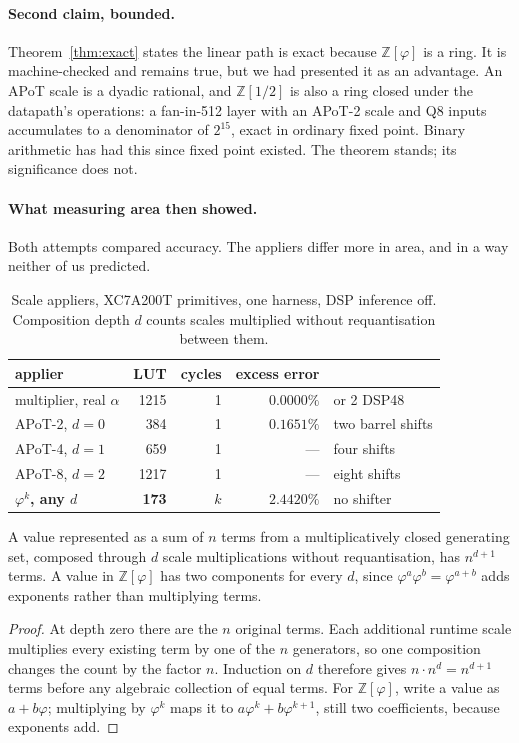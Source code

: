 \paragraph{Second claim, bounded.} Theorem~\ref{thm:exact} states the linear path
is exact because $\mathbb{Z}[\varphi]$ is a ring. It is machine-checked and
remains true, but we had presented it as an advantage. An APoT scale is a dyadic
rational, and $\mathbb{Z}[1/2]$ is also a ring closed under the datapath's
operations: a fan-in-512 layer with an APoT-2 scale and Q8 inputs accumulates to a
denominator of $2^{15}$, exact in ordinary fixed point. Binary arithmetic has had
this since fixed point existed. The theorem stands; its significance does not.

\paragraph{What measuring area then showed.} Both attempts compared accuracy. The
appliers differ more in area, and in a way neither of us predicted.

\begin{table}[t]\centering
\caption{Scale appliers, XC7A200T primitives, one harness, DSP inference off.
Composition depth $d$ counts scales multiplied without requantisation between
them.}
\label{tab:scalefrontier}
\begin{tabular}{lrrrl}
\toprule
applier & LUT & cycles & excess error & \\
\midrule
multiplier, real $\alpha$ & 1215 & 1 & $0.0000\%$ & or 2 DSP48 \\
APoT-2, $d=0$ & 384 & 1 & $0.1651\%$ & two barrel shifts \\
APoT-4, $d=1$ & 659 & 1 & --- & four shifts \\
APoT-8, $d=2$ & 1217 & 1 & --- & eight shifts \\
\textbf{$\varphi^{k}$, any $d$} & \textbf{173} & $k$ & $2.4420\%$ & no shifter \\
\bottomrule
\end{tabular}
\end{table}

\begin{theorem}
\label{thm:termgrowth}
A value represented as a sum of $n$ terms from a multiplicatively closed
generating set, composed through $d$ scale multiplications without
requantisation, has $n^{d+1}$ terms. A value in $\mathbb{Z}[\varphi]$ has two
components for every $d$, since $\varphi^{a}\varphi^{b} = \varphi^{a+b}$ adds
exponents rather than multiplying terms.
\end{theorem}
\begin{proof}
At depth zero there are the $n$ original terms.  Each additional runtime scale
multiplies every existing term by one of the $n$ generators, so one composition
changes the count by the factor $n$.  Induction on $d$ therefore gives
$n\cdot n^{d}=n^{d+1}$ terms before any algebraic collection of equal terms.
For $\mathbb{Z}[\varphi]$, write a value as $a+b\varphi$; multiplying by
$\varphi^{k}$ maps it to
$a\varphi^{k}+b\varphi^{k+1}$, still two coefficients, because exponents add.
\end{proof}

